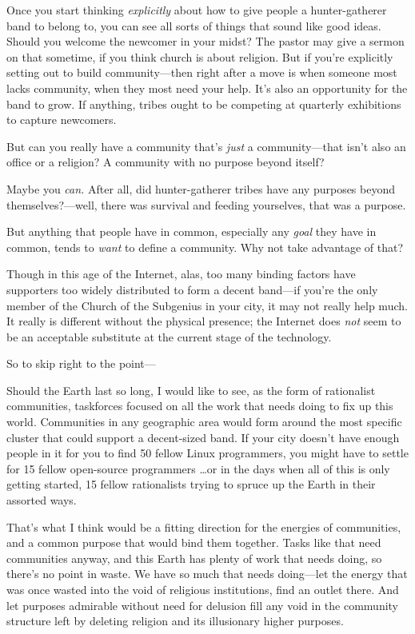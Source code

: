 {
 Once you start thinking \textit{explicitly} about how to give
people a hunter-gatherer band to belong to, you can see all sorts of
things that sound like good ideas. Should you welcome the newcomer in
your midst? The pastor may give a sermon on that sometime, if you think
church is about religion. But if you're explicitly
setting out to build community---then right after a move is when
someone most lacks community, when they most need your help.
It's also an opportunity for the band to grow. If
anything, tribes ought to be competing at quarterly exhibitions to
capture newcomers.}

{
 But can you really have a community that's
\textit{just} a community---that isn't also an office
or a religion? A community with no purpose beyond itself?}

{
 Maybe you \textit{can.} After all, did hunter-gatherer tribes have
any purposes beyond themselves?---well, there was survival and feeding
yourselves, that was a purpose.}

{
 But anything that people have in common, especially any
\textit{goal} they have in common, tends to \textit{want} to define a
community. Why not take advantage of that?}

{
 Though in this age of the Internet, alas, too many binding factors
have supporters too widely distributed to form a decent band---if
you're the only member of the Church of the Subgenius
in your city, it may not really help much. It really is different
without the physical presence; the Internet does \textit{not} seem to
be an acceptable substitute at the current stage of the technology.}

{
 So to skip right to the point---}

{
 Should the Earth last so long, I would like to see, as the form of
rationalist communities, taskforces focused on all the work that needs
doing to fix up this world. Communities in any geographic area would
form around the most specific cluster that could support a decent-sized
band. If your city doesn't have enough people in it for
you to find 50 fellow Linux programmers, you might have to settle for
15 fellow open-source programmers \ldots or in the days when all of this
is only getting started, 15 fellow rationalists trying to spruce up the
Earth in their assorted ways.}

{
 That's what I think would be a fitting direction
for the energies of communities, and a common purpose that would bind
them together. Tasks like that need communities anyway, and this Earth
has plenty of work that needs doing, so there's no
point in waste. We have so much that needs doing---let the energy that
was once wasted into the void of religious institutions, find an outlet
there. And let purposes admirable without need for delusion fill any
void in the community structure left by deleting religion and its
illusionary higher purposes.}

